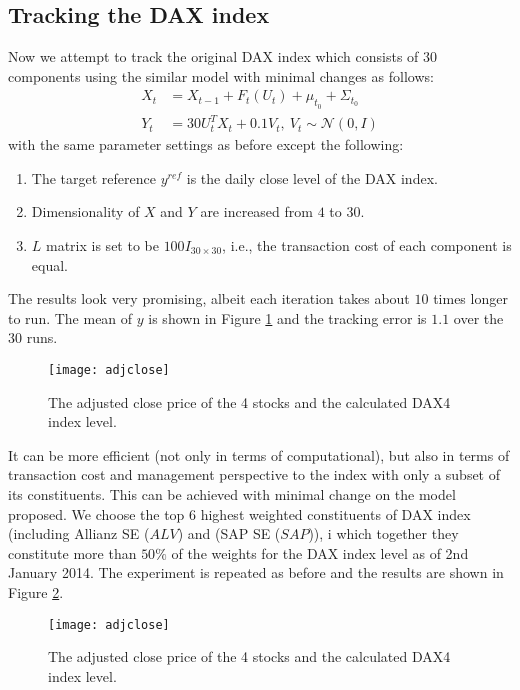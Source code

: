 \subsection{Tracking the DAX index}
Now we attempt to track the original DAX index which consists of $30$ components using the similar model with minimal changes as follows:
\begin{align}
  X_t &= X_{t-1} + F_t(U_t) + \mu_{t_0} + \Sigma_{t_0} \\
  Y_t &= 30U^T_tX_t + 0.1V_t,~V_t \sim \mathcal{N}(0, I)
\end{align}
with the same parameter settings as before except the following:
\begin{enumerate}
\item The target reference $y^{ref}$ is the daily close level of the DAX index.
\item Dimensionality of $X$ and $Y$ are increased from $4$ to $30$.
\item $L$ matrix is set to be $100I_{30 \times 30}$, i.e., the transaction cost of each component is equal.
\end{enumerate}
The results look very promising, albeit each iteration takes about $10$ times longer to run. The mean of $y$ is shown in Figure \ref{fig:dax} and the tracking error is $1.1$ over the $30$ runs.
 
\begin{figure}[htbp]
\centering
\texttt{[image: adjclose]}
\caption{The adjusted close price of the 4 stocks and the calculated DAX4 index level.}
\label{fig:dax}
\end{figure}

It can be more efficient (not only in terms of computational), but also in terms of transaction cost and management perspective to the index with only a subset of its constituents. This can be achieved with minimal change on the model proposed. We choose the top $6$ highest weighted constituents of DAX index (including Allianz SE ($ALV$) and (SAP SE ($SAP$)), i which together they constitute more than $50\%$ of the weights for the DAX index level as of 2nd January 2014. The experiment is repeated as before and the results are shown in Figure \ref{fig:daxpartial}.
 
\begin{figure}[htbp]
\centering
\texttt{[image: adjclose]}
\caption{The adjusted close price of the 4 stocks and the calculated DAX4 index level.}
\label{fig:daxpartial}
\end{figure}

